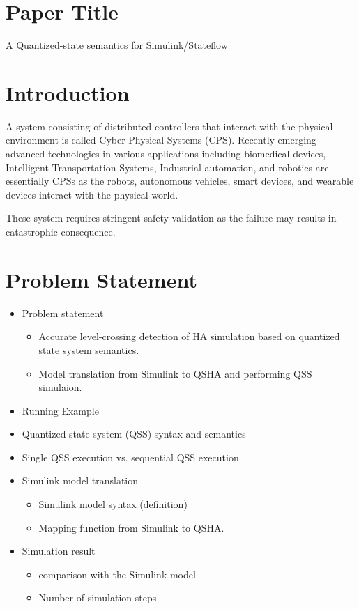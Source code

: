 \documentclass[twoside,a4paper,12pt]{article}
\theoremstyle{definition}
\begin{document}
\section{Paper Title}
A Quantized-state semantics for Simulink/Stateflow

\section{Introduction}
A system consisting of distributed controllers that interact with the physical environment is called Cyber-Physical Systems (CPS). 
Recently emerging advanced technologies in various applications including biomedical devices, Intelligent Transportation Systems, Industrial automation, and robotics are essentially CPSs as the robots, autonomous vehicles, smart devices, and wearable devices interact with the physical world.

These system requires stringent safety validation as the failure may results in catastrophic consequence.


\section{Problem Statement}
\begin{itemize}
	\item Problem statement
		\begin{itemize}
			\item Accurate level-crossing detection of HA simulation based on quantized state system semantics. 
			\item Model translation from Simulink to QSHA and performing QSS simulaion.
		\end{itemize}
	\item Running Example
	\item Quantized state system (QSS) syntax and semantics
	\item Single QSS execution vs. sequential QSS execution
	\item Simulink model translation
		\begin{itemize}
			\item Simulink model syntax (definition)
			\item Mapping function from Simulink to QSHA.
		\end{itemize}
	\item Simulation result
		\begin{itemize}
			\item comparison with the Simulink model
			\item Number of simulation steps
		\end{itemize}
\end{itemize}
\end{document}
